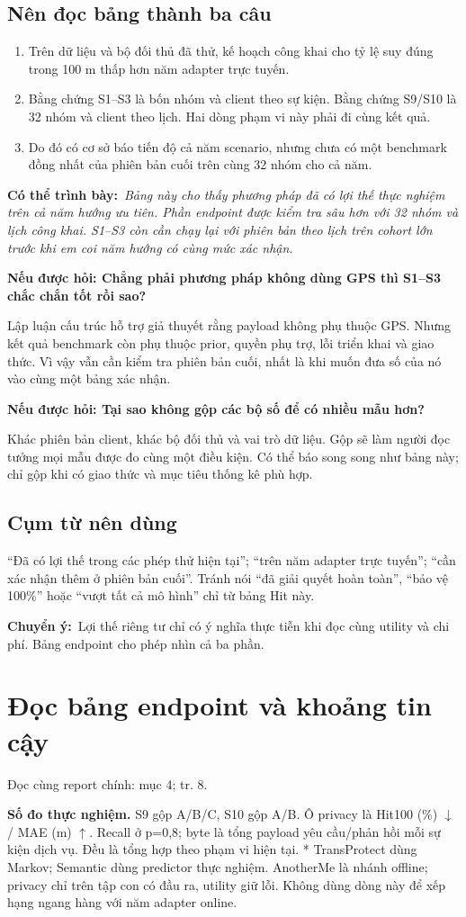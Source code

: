 \documentclass[10pt,a4paper]{article}
\newcommand{\say}[1]{\par\textbf{Có thể trình bày:}\ \textit{#1}\par}
\newcommand{\ask}[2]{\par\textbf{Nếu được hỏi: #1}\par #2\par}
\newcommand{\where}[1]{\par{\small\color{gray}Đọc cùng report chính: #1.}\par}
\newcommand{\transition}[1]{\par\textbf{Chuyển ý:}\ #1\par}
\newcommand{\guidepage}[1]{\clearpage\section{#1}}
\begin{document}
\subsection*{Nên đọc bảng thành ba câu}
\begin{enumerate}
\item Trên dữ liệu và bộ đối thủ đã thử, kế hoạch công khai cho tỷ lệ suy đúng trong 100 m thấp hơn năm adapter trực tuyến.
\item Bằng chứng S1--S3 là bốn nhóm và client theo sự kiện. Bằng chứng S9/S10 là 32 nhóm và client theo lịch. Hai dòng phạm vi này phải đi cùng kết quả.
\item Do đó có cơ sở báo tiến độ cả năm scenario, nhưng chưa có một benchmark đồng nhất của phiên bản cuối trên cùng 32 nhóm cho cả năm.
\end{enumerate}

\say{Bảng này cho thấy phương pháp đã có lợi thế thực nghiệm trên cả năm hướng ưu tiên. Phần endpoint được kiểm tra sâu hơn với 32 nhóm và lịch công khai. S1--S3 còn cần chạy lại với phiên bản theo lịch trên cohort lớn trước khi em coi năm hướng có cùng mức xác nhận.}

\ask{Chẳng phải phương pháp không dùng GPS thì S1--S3 chắc chắn tốt rồi sao?}{Lập luận cấu trúc hỗ trợ giả thuyết rằng payload không phụ thuộc GPS. Nhưng kết quả benchmark còn phụ thuộc prior, quyền phụ trợ, lỗi triển khai và giao thức. Vì vậy vẫn cần kiểm tra phiên bản cuối, nhất là khi muốn đưa số của nó vào cùng một bảng xác nhận.}

\ask{Tại sao không gộp các bộ số để có nhiều mẫu hơn?}{Khác phiên bản client, khác bộ đối thủ và vai trò dữ liệu. Gộp sẽ làm người đọc tưởng mọi mẫu được đo cùng một điều kiện. Có thể báo song song như bảng này; chỉ gộp khi có giao thức và mục tiêu thống kê phù hợp.}

\subsection*{Cụm từ nên dùng}
``Đã có lợi thế trong các phép thử hiện tại''; ``trên năm adapter trực tuyến''; ``cần xác nhận thêm ở phiên bản cuối''. Tránh nói ``đã giải quyết hoàn toàn'', ``bảo vệ 100\%'' hoặc ``vượt tất cả mô hình'' chỉ từ bảng Hit này.
\transition{Lợi thế riêng tư chỉ có ý nghĩa thực tiễn khi đọc cùng utility và chi phí. Bảng endpoint cho phép nhìn cả ba phần.}

\guidepage{Đọc bảng endpoint và khoảng tin cậy}
\where{mục 4; tr. 8}
\textbf{Số đo thực nghiệm.} S9 gộp A/B/C, S10 gộp A/B. Ô privacy là Hit100 (\%) $\downarrow$ / MAE (m) $\uparrow$. Recall ở p=0,8; byte là tổng payload yêu cầu/phản hồi mỗi sự kiện dịch vụ. Đều là tổng hợp theo phạm vi hiện tại.
\EndpointEvidence
* TransProtect dùng Markov; Semantic dùng predictor thực nghiệm. AnotherMe là nhánh offline; privacy chỉ trên tập con có đầu ra, utility giữ lỗi. Không dùng dòng này để xếp hạng ngang hàng với năm adapter online.
\end{document}

